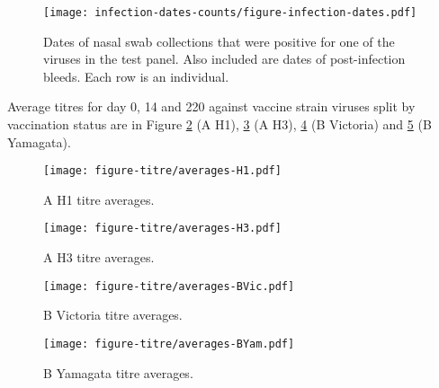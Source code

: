 \documentclass[12pt]{article}
\begin{document}
\begin{figure}
	\texttt{[image: infection-dates-counts/figure-infection-dates.pdf]}
	\caption{Dates of nasal swab collections that were positive for one of the viruses in the test panel. Also included are dates of post-infection bleeds. Each row is an individual.}
	\label{fig:postinf-bleed-dates}
\end{figure}

Average titres for day 0, 14 and 220 against vaccine strain viruses split by vaccination status are in Figure \ref{fig:titre-averages-H1} (A H1), \ref{fig:titre-averages-H3} (A H3), \ref{fig:titre-averages-BVic} (B Victoria) and \ref{fig:titre-averages-BYam} (B Yamagata).

\begin{figure}
	\texttt{[image: figure-titre/averages-H1.pdf]}
	\caption{A H1 titre averages.}
	\label{fig:titre-averages-H1}
\end{figure}

\begin{figure}
	\texttt{[image: figure-titre/averages-H3.pdf]}
	\caption{A H3 titre averages.}
	\label{fig:titre-averages-H3}
\end{figure}

\begin{figure}
	\texttt{[image: figure-titre/averages-BVic.pdf]}
	\caption{B Victoria titre averages.}
	\label{fig:titre-averages-BVic}
\end{figure}

\begin{figure}
	\texttt{[image: figure-titre/averages-BYam.pdf]}
	\caption{B Yamagata titre averages.}
	\label{fig:titre-averages-BYam}
\end{figure}
\end{document}
